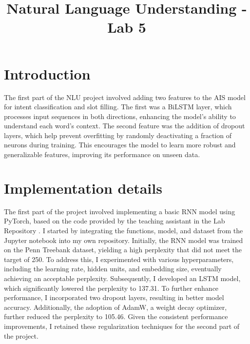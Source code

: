 \documentclass[a4paper]{article}
\title{Natural Language Understanding - Lab 5}
\begin{document}
\maketitle
%
%
\section{Introduction}
The first part of the NLU project involved adding two features to the AIS model for intent classification and slot filling.
 The first was a BiLSTM layer, which processes input sequences in both directions, enhancing the model’s ability to understand each word’s context. 
 The second feature was the addition of dropout layers, which help prevent overfitting by randomly deactivating a fraction of neurons during training.
  This encourages the model to learn more robust and generalizable features, improving its performance on unseen data.
  





\section{Implementation details}

The first part of the project involved implementing a basic RNN model using PyTorch, 
based on the code provided by the teaching assistant in the Lab Repository \cite{nlu-labs-unitn}.
 I started by integrating the functions, model, and dataset from the Jupyter notebook into my own 
 repository. Initially, the RNN model was trained on the Penn Treebank dataset, yielding a high 
 perplexity that did not meet the target of 250. To address this, I experimented with various 
 hyperparameters, including the learning rate, hidden units, and embedding size, eventually 
 achieving an acceptable perplexity. Subsequently, I developed an LSTM model, which significantly 
 lowered the perplexity to 137.31. To further enhance performance, I incorporated two dropout layers,
  resulting in better model accuracy. Additionally, the adoption of AdamW, a weight decay optimizer, 
  further reduced the perplexity to 105.46. Given the consistent performance improvements, I retained
   these regularization techniques for the second part of the project.
\end{document}
